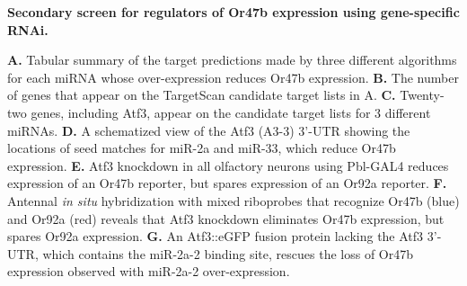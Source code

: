 {\bf Secondary screen for regulators of Or47b expression using gene-specific RNAi.}

\textbf{A.} Tabular summary of the target predictions made by three different algorithms for each miRNA whose over-expression reduces Or47b expression.
\textbf{B.} The number of genes that appear on the TargetScan candidate target lists in A.
\textbf{C.} Twenty-two genes, including Atf3, appear on the candidate target lists for 3 different miRNAs.
\textbf{D.} A schematized view of the Atf3 (A3-3) 3'-UTR showing the locations of seed matches for miR-2a and miR-33, which reduce Or47b expression.
\textbf{E.} Atf3 knockdown in all olfactory neurons using Pbl-GAL4 reduces expression of an Or47b reporter, but spares expression of an Or92a reporter.
\textbf{F.} Antennal \textit{in situ} hybridization with mixed riboprobes that recognize Or47b (blue) and Or92a (red) reveals that Atf3 knockdown eliminates Or47b expression, but spares Or92a expression.
\textbf{G.} An Atf3::eGFP fusion protein lacking the Atf3 3'-UTR, which contains the miR-2a-2 binding site, rescues the loss of Or47b expression observed with miR-2a-2 over-expression.
\label{fig:2}